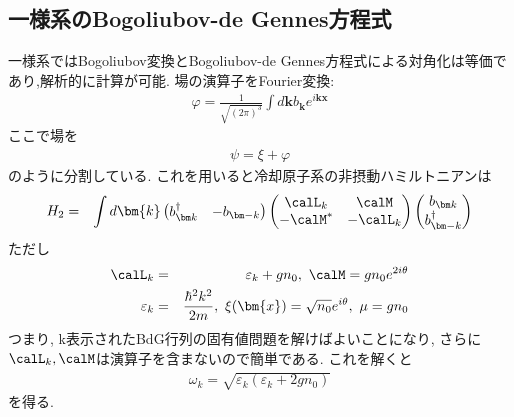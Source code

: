 \subsection{一様系のBogoliubov-de Gennes方程式}
一様系ではBogoliubov変換とBogoliubov-de Gennes方程式による対角化は等価であり,解析的に計算が可能. 場の演算子をFourier変換:
\begin{eqnarray}
  \varphi = \frac{1}{\sqrt{(2\pi)^3}}\int d\bm{k} b_{\bm k}e^{i\bm{kx}}
\end{eqnarray}
ここで場を
\begin{eqnarray}
  \psi = \xi + \varphi
\end{eqnarray}
のように分割している. これを用いると冷却原子系の非摂動ハミルトニアンは
\begin{eqnarray}
  H_2 &=& \int d\bm{k}
  \begin{pmatrix}
    b_{\bm k}^\dagger &-b_{\bm -k} 
  \end{pmatrix}
  \begin{pmatrix}
    \calL_k &\calM\\
    -\calM^* &-\calL_k
  \end{pmatrix}
  \begin{pmatrix}
    b_{\bm k}\\
    b_{\bm -k}^\dagger 
  \end{pmatrix}
\end{eqnarray}
ただし
\begin{eqnarray}
  \calL_k &=& \varepsilon_k + gn_0,\ \calM = gn_0e^{2i\theta}\\
  \varepsilon_k &=& \frac{\hbar^2k^2}{2m},\ \xi(\bm{x}) = \sqrt{n_0}e^{i\theta},\ \mu = gn_0
\end{eqnarray}
つまり, k表示されたBdG行列の固有値問題を解けばよいことになり, さらに$\calL_k, \calM$は演算子を含まないので簡単である. これを解くと
\begin{eqnarray}
  \omega_k = \sqrt{\varepsilon_k(\varepsilon_k + 2gn_0)}
\end{eqnarray}
を得る.
